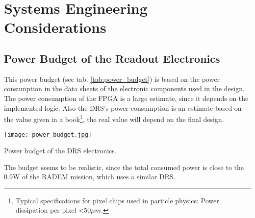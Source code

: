 \section{Systems Engineering Considerations}
\label{sec:systems_engineering}


\subsection{Power Budget of the Readout Electronics}
\label{sec:power_budget}
This power budget (see tab. \ref{tab:power_budget}) is based on the power consumption in the data sheets of the electronic components used in the design.
The power consumption of the FPGA is a large estimate, since it depends on the implemented logic.
Also the DRS's power consumption is an estimate based on the value given in a book\footnote{Typical specifications for pixel chips used in particle physics: Power dissipation per pixel \textless $50\mu m$.\cite{rossi2006pixel}}, the real value will depend on the final design.
\begin{table}[H]
	\centering
    \texttt{[image: power\_budget.jpg]}
    \caption[Power Budget]{Power budget of the DRS electronics.}
	\label{tab:power_budget}
\end{table}

The budget seems to be realistic, since the total consumed power is close to the 0.9W\cite[p. 11, tab. 4]{tantalumproject2016} of the RADEM mission, which uses a similar DRS.
